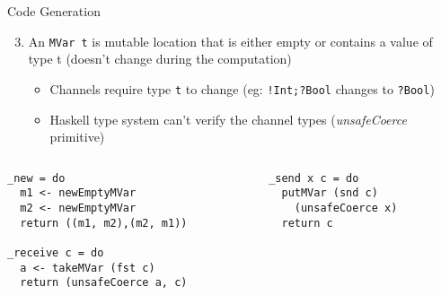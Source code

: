 \documentclass[unknownkeysallowed]{beamer}
\begin{document}
\lstset{language=Haskell, style= eclipse}
\begin{frame}[fragile]{Code Generation}
  \begin{enumerate}
  \setcounter{enumi}{2}    
  \item An \lstinline|MVar t| is mutable location that is either empty or contains a value of type t (doesn't change during the computation)
    \begin{itemize}
    \item Channels require type \lstinline|t| to change (eg: \lstinline|!Int;?Bool| changes to \lstinline|?Bool|)
    \item Haskell type system can't verify the channel types (\textit{unsafeCoerce} primitive)
    \end{itemize}
  \end{enumerate}
  \pause
  \begin{columns}[onlytextwidth,T]
  \begin{column}{0.6\textwidth}
    \begin{lstlisting}
_new = do
  m1 <- newEmptyMVar
  m2 <- newEmptyMVar
  return ((m1, m2),(m2, m1))

_receive c = do
  a <- takeMVar (fst c)
  return (unsafeCoerce a, c)
    \end{lstlisting}
  \end{column}
  \begin{column}{0.4\textwidth}
    \begin{lstlisting}
_send x c = do
  putMVar (snd c)
    (unsafeCoerce x)
  return c
    \end{lstlisting}
  \end{column}
  \end{columns}
\end{frame}
\end{document}
